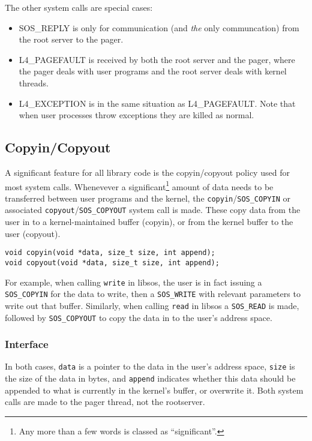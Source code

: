 \documentclass[12pt,english]{article}
\begin{document}
The other system calls are special cases:
\begin{itemize}
\item SOS\_REPLY is only for communication (and \emph{the} only communcation) from the root server to the pager.
\item L4\_PAGEFAULT is received by both the root server and the pager, where the pager deals with user programs and the root server deals with kernel threads.
\item L4\_EXCEPTION is in the same situation as L4\_PAGEFAULT.  Note that when user processes throw exceptions they are killed as normal.
\end{itemize}

\subsection{Copyin/Copyout} \label{sub:copyin_copyout}

A significant feature for all library code is the copyin/copyout policy used for most system calls.  Whenevever a significant\footnote{Any more than a few words is classed as ``significant''.} amount of data needs to be transferred between user programs and the kernel, the \texttt{copyin}/\texttt{SOS\_COPYIN} or associated \texttt{copyout}/\texttt{SOS\_COPYOUT} system call is made.  These copy data from the user in to a kernel-maintained buffer (copyin), or from the kernel buffer to the user (copyout).

\begin{verbatim}
void copyin(void *data, size_t size, int append);
void copyout(void *data, size_t size, int append);
\end{verbatim}

For example, when calling \texttt{write} in libsos, the user is in fact issuing a \texttt{SOS\_COPYIN} for the data to write, then a \texttt{SOS\_WRITE} with relevant parameters to write out that buffer.  Similarly, when calling \texttt{read} in libsos a \texttt{SOS\_READ} is made, followed by \texttt{SOS\_COPYOUT} to copy the data in to the user's address space.

\subsubsection{Interface}

In both cases, \texttt{data} is a pointer to the data in the user's address space, \texttt{size} is the size of the data in bytes, and \texttt{append} indicates whether this data should be appended to what is currently in the kernel's buffer, or overwrite it.  Both system calls are made to the pager thread, not the rootserver.
\end{document}
